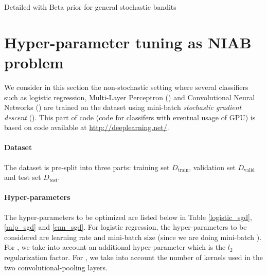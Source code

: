 \documentclass[twoside,11pt]{article}
\begin{document}
\begin{algorithm}[h]

\caption{Detailed \TTTS with Beta prior for general stochastic bandits\label{annexe1}}
\end{algorithm}

\section{Hyper-parameter tuning as NIAB problem}

We consider in this section the non-stochastic setting where several classifiers such as logistic regression, Multi-Layer Perceptron (\MLP) and Convolutional Neural Networks (\CNN) are trained on the \MNIST dataset using mini-batch \emph{stochastic gradient descent} (\SGD). This part of code (code for classifers with eventual usage of GPU) is based on code available at \url{http://deeplearning.net/}. 

\paragraph{\textbf{Dataset}} The \MNIST dataset is pre-split into three parts: training set $D_{\operatorname{train}}$, validation set $D_{\operatorname{valid}}$ and test set $D_{\operatorname{test}}$.

\paragraph{\textbf{Hyper-parameters}} The hyper-parameters to be optimized are listed below in Table \ref{logistic_sgd}, \ref{mlp_sgd} and \ref{cnn_sgd}. For logistic regression, the hyper-parameters to be considered are learning rate and mini-batch size (since we are doing mini-batch \SGD). For \MLP, we take into account an additional hyper-parameter which is the $l_2$ regularization factor. For \CNN, we take into account the number of kernels used in the two convolutional-pooling layers.
\end{document}
